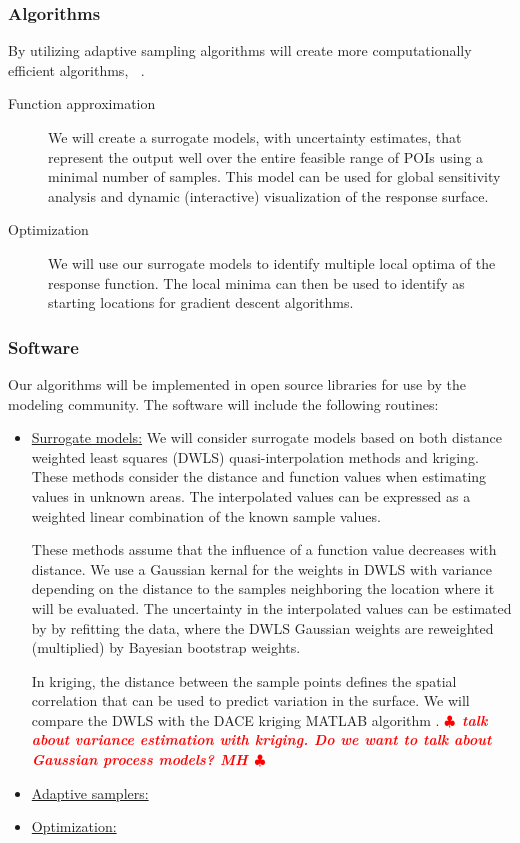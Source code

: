 \documentclass[11pt]{NSFamsart}
\DeclareMathOperator{\QOI}{QOI}
\DeclareMathOperator{\APP}{\widehat{\QOI}}
\newif\ifnotesw \noteswtrue
\newcommand{\notes}[1]{\ifnotesw \textcolor{red}{  $\clubsuit$\ {\sf \bf \it  #1}\ $\clubsuit$  }\fi}
\begin{document}
\subsubsection{Algorithms}
By utilizing adaptive sampling algorithms will create more computationally efficient algorithms, $\APP$.
\renewcommand{\descriptionlabel}[1]{\hspace{\labelsep}\textit{#1}.}
\begin{description}
\item[Function approximation] We will create a surrogate models, with uncertainty estimates, that represent the output well over the entire feasible range of POIs using a minimal number of samples.  This model can be used for global sensitivity analysis and dynamic (interactive) visualization of the response surface. 
\item[Optimization] We will use our surrogate models to identify multiple local optima of the response function.  The local minima can then be used to identify as starting locations for gradient descent algorithms.
\end{description}

\subsubsection{Software}
Our algorithms will be implemented in open source libraries for use by the modeling community.  The software will include the following routines:
\begin{itemize}
\item \underline{Surrogate models:} We will consider surrogate models based on both distance weighted least squares (DWLS) quasi-interpolation methods and kriging.  
These methods consider the distance and function values when estimating values in unknown areas. The interpolated values can be expressed as a weighted linear combination of the known sample values. 

These methods assume that the influence of a function value decreases with distance.  We use a Gaussian kernal for the weights in DWLS with variance depending on the distance to the samples neighboring the location where it will be evaluated.
The uncertainty in the interpolated values can be estimated by  by refitting the data, where the DWLS Gaussian weights are reweighted (multiplied) by Bayesian bootstrap weights.  

In kriging,  the distance between the sample points defines the spatial correlation that can be used to predict variation in the surface. We will compare the DWLS with the DACE kriging MATLAB algorithm \cite{}. \notes{talk about variance estimation with kriging.  Do we want to talk about Gaussian process models? MH}

\item \underline{Adaptive samplers:}

\item \underline{Optimization:}

\end{itemize}
\end{document}
